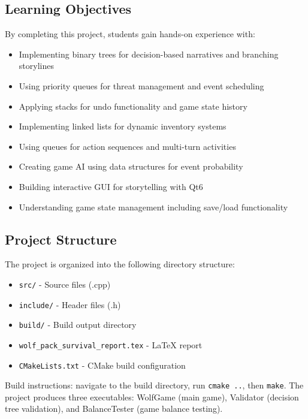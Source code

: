 \documentclass[12pt,a4paper]{article}
\begin{document}
\subsection{Learning Objectives}
By completing this project, students gain hands-on experience with:
\begin{itemize}
	\item Implementing binary trees for decision-based narratives and branching storylines
	\item Using priority queues for threat management and event scheduling
	\item Applying stacks for undo functionality and game state history
	\item Implementing linked lists for dynamic inventory systems
	\item Using queues for action sequences and multi-turn activities
	\item Creating game AI using data structures for event probability
	\item Building interactive GUI for storytelling with Qt6
	\item Understanding game state management including save/load functionality
\end{itemize}

\subsection{Project Structure}
The project is organized into the following directory structure:
\begin{itemize}
	\item \texttt{src/} - Source files (.cpp)
	\item \texttt{include/} - Header files (.h)
	\item \texttt{build/} - Build output directory
	\item \texttt{wolf\_pack\_survival\_report.tex} - LaTeX report
	\item \texttt{CMakeLists.txt} - CMake build configuration
\end{itemize}

Build instructions: navigate to the build directory, run \texttt{cmake ..}, then \texttt{make}. The project produces three executables: WolfGame (main game), Validator (decision tree validation), and BalanceTester (game balance testing).
\end{document}
